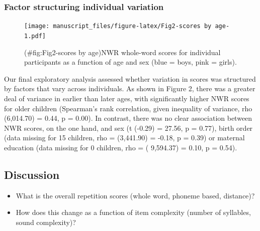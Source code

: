 \documentclass[english,,man,floatsintext]{apa6}
\begin{document}
\subsubsection{Factor structuring individual
variation}\label{factor-structuring-individual-variation}

\begin{figure}
\centering
\texttt{[image: manuscript\_files/figure-latex/Fig2-scores by age-1.pdf]}
\caption{(\#fig:Fig2-scores by age)NWR whole-word scores for individual
participants as a function of age and sex (blue = boys, pink = girls).}
\end{figure}

Our final exploratory analysis assessed whether variation in scores was
structured by factors that vary across individuals. As shown in Figure
2, there was a greater deal of variance in earlier than later ages, with
significantly higher NWR scores for older children (Spearman's rank
correlation, given inequality of variance, rho (6,014.70) = 0.44, p =
0.00). In contrast, there was no clear association between NWR scores,
on the one hand, and sex (t (-0.29) = 27.56, p = 0.77), birth order
(data missing for 15 children, rho = (3,441.90) = -0.18, p = 0.39) or
maternal education (data missing for 0 children, rho = ( 9,594.37) =
0.10, p = 0.54).

\subsection{Discussion}\label{discussion}

\begin{itemize}
\item
  What is the overall repetition scores (whole word, phoneme based,
  distance)?
\item
  How does this change as a function of item complexity (number of
  syllables, sound complexity)?
\end{itemize}
\end{document}
